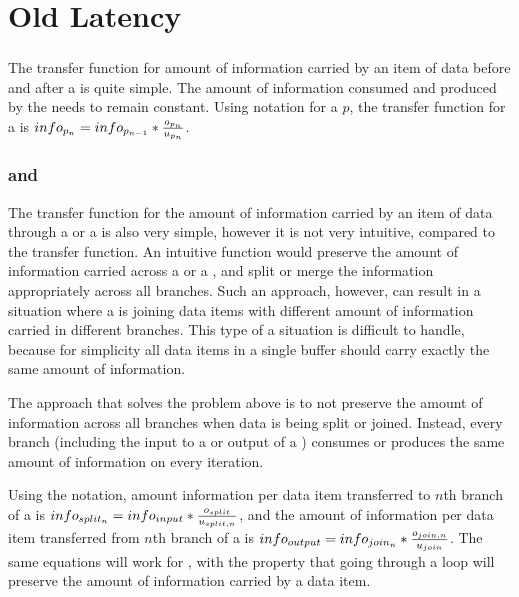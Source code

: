 \section{Old Latency}

\subsubsection{\filters}

The transfer function for amount of information carried by an item
of data before and after a {\filter} is quite simple.  The amount of
information consumed and produced by the {\filter} needs to remain
constant.  Using notation for a {\pipeline} $p$, the transfer
function for a {\filter} is $info_{p_n} = info_{p_{n-1}} * {o_{p_n}
\over u_{p_n}}$.

\subsubsection{{\splitters} and {\joiners}}

The transfer function for the amount of information carried by an
item of data through a {\splitter} or a {\joiner} is also very simple,
however it is not very intuitive, compared to the {\filter} transfer
function. An intuitive function would preserve the amount of
information carried across a {\splitter} or a {\joiner}, and split or
merge the information appropriately across all branches.  Such an
approach, however, can result in a situation where a {\joiner} is
joining data items with different amount of information carried in
different branches.  This type of a situation is difficult to
handle, because for simplicity all data items in a single buffer
should carry exactly the same amount of information.

The approach that solves the problem above is to not preserve the
amount of information across all branches when data is being split
or joined. Instead, every branch (including the input to a
{\splitter} or output of a {\joiner}) consumes or produces the same
amount of information on every iteration.

Using the {\splitjoin} notation, amount information per data item
transferred to $n$th branch of a {\splitter} is $info_{split_n} =
info_{input} * {o_{split} \over u_{split,n}}$, and the amount of
information per data item transferred from $n$th branch of a
{\joiner} is $info_{output} = info_{join_n} * {o_{join,n} \over
u_{join}}$.  The same equations will work for {\feedbackloops}, with
the property that going through a loop will preserve the amount of
information carried by a data item.

